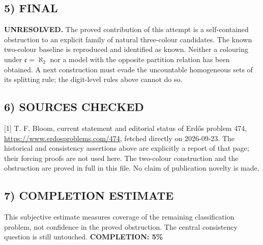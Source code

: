\subsection*{5) FINAL}
\textbf{UNRESOLVED.} The proved contribution of this attempt is a self-contained obstruction to an explicit family of natural three-colour candidates. The known two-colour baseline is reproduced and identified as known. Neither a colouring under $\mathfrak c=\aleph_2$ nor a model with the opposite partition relation has been obtained. A next construction must evade the uncountable homogeneous sets of its splitting rule; the digit-level rules above cannot do so.

\subsection*{6) SOURCES CHECKED}
[1] T. F. Bloom, current statement and editorial status of Erd\H{o}s problem 474, \url{https://www.erdosproblems.com/474}, fetched directly on 2026-09-23. The historical and consistency assertions above are explicitly a report of that page; their forcing proofs are not used here. The two-colour construction and the obstruction are proved in full in this file. No claim of publication novelty is made.

\subsection*{7) COMPLETION ESTIMATE}
This subjective estimate measures coverage of the remaining classification problem, not confidence in the proved obstruction. The central consistency question is still untouched.
\textbf{COMPLETION: 5\%}
